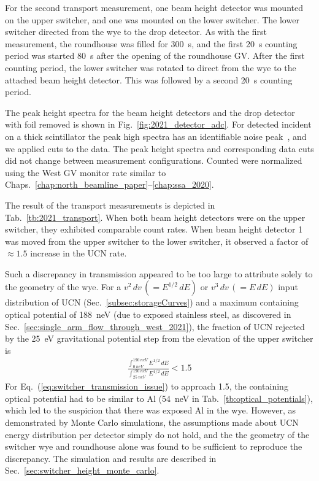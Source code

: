 For the second \ucn transport measurement, one beam height detector was mounted on the upper switcher, and one was mounted on the lower switcher. The lower switcher directed \ucn from the wye to the drop detector. As with the first measurement, the roundhouse was filled for \qty{300}{s}, and the first \qty{20}{s} counting period was started \qty{80}{s} after the opening of the roundhouse GV. After the first counting period, the lower switcher was rotated to direct \ucn from the wye to the attached beam height detector. This was followed by a second \qty{20}{s} counting period.

The peak height spectra for the beam height detectors and the drop detector with foil removed is shown in Fig.~\ref{fig:2021_detector_adc}. For detected \ucn incident on a thick \BZnS scintillator the peak high spectra has an identifiable noise peak~\cite{jeph_multilayer_2015}, and we applied cuts to the data. The peak height spectra and corresponding data cuts did not change between measurement configurations. Counted \ucn were normalized using the West GV monitor rate similar to Chaps.~\ref{chap:north_beamline_paper}--\ref{chap:ssa_2020}. 

The result of the transport measurements is depicted in Tab.~\ref{tb:2021_transport}. When both beam height detectors were on the upper switcher, they exhibited comparable count rates. When beam height detector 1 was moved from the upper switcher to the lower switcher, it observed a factor of $\approx 1.5$ increase in the UCN rate. 

Such a discrepancy in transmission appeared to be too large to attribute solely to the geometry of the wye. For a $v^2\,dv\,(=E^{1/2}\,dE)$ or $v^3\,dv\,(=E\,dE)$ input distribution of UCN (Sec.~\ref{subsec:storageCurves}) and a maximum containing optical potential of \qty{188}{\nano\eV} (due to exposed stainless steel, as discovered in Sec.~\ref{sec:single_arm_flow_through_west_2021}), the fraction of UCN rejected by the \qty{25}{\eV} gravitational potential step from the elevation of the upper switcher is
%
\begin{gather}
    \frac{\int_{\qty{0}{neV}}^{\qty{190}{neV}}E^{1/2}\,dE}{\int_{\qty{25}{neV}}^{\qty{190}{neV}}E^{1/2}\,dE} < 1.5 \label{eq:switcher_transmission_issue}
\end{gather}
%
For Eq.~(\ref{eq:switcher_transmission_issue}) to approach 1.5, the containing optical potential had to be similar to Al (\qty{54}{\nano\eV} in Tab.~\ref{tb:optical_potentials}), which led to the suspicion that there was exposed Al in the wye. However, as demonstrated by Monte Carlo simulations, the assumptions made about UCN energy distribution per detector simply do not hold, and the the geometry of the switcher wye and roundhouse alone was found to be sufficient to reproduce the discrepancy. The simulation and results are described in Sec.~\ref{sec:switcher_height_monte_carlo}.

